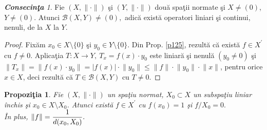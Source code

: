 \documentclass[ a4paper, 12pt]{report}
\newtheorem{prop}[theorem]{\bf Propozi\c tia }
\theoremstyle{definition}
\theoremstyle{remark}
\newtheorem{cons}{\bf Consecin\c ta }[section]
\numberwithin{equation}{section}
\begin{document}
\begin{cons}\label{c122}
Fie $(X, \lVert \cdot \rVert)$ \c si $(Y,\lVert \cdot  \rVert)$ dou\u a spa\c tii normate \c si $X \neq (0)$,\\
$Y \neq (0)$. Atunci $\mathcal{B}(X,Y) \neq (0),$ adic\u a exist\u a operatori liniari \c si continui, nenuli, de la $X$ la $Y$.
\end{cons}
\begin{proof}
Fix\u am $x_0 \in X\setminus \{ 0 \}$ \c si $y_0 \in Y \setminus \{ 0 \}$. Din Prop. \ref{p125}, rezult\u a c\u a exist\u a $f \in X^{'}$ cu $f \neq 0.$
Aplica\c tia $T : X \rightarrow Y,\  T_x = f(x) \cdot y_0$ este liniar\u a \c si nenul\u a $(y_0 \neq 0)$ \c si $\lVert T_x \rVert = \lVert f(x) \cdot y_0 \rVert = \lvert f(x) \rvert \cdot \lVert y_0 \rVert \leq \lVert f  \rVert \cdot \lVert y_0 \rVert \cdot \lVert x \rVert$, pentru orice $x \in X$, deci rezult\u a c\u a $T \in \mathcal{B}(X,Y) $ cu $T \neq 0.$
\end{proof}
\begin{prop}\label{p126}
Fie $(X,\lVert \cdot \rVert)$ un spa\c tiu normat, $X_0 \subset X$ un subspa\c tiu liniar \^inchis \c si $x_0 \in X \setminus X_0$.
Atunci exist\u a $f \in X^{'}$ cu $f(x_0) = 1$ \c si $f/X_0 = 0.$\\
\^In plus, $\lVert f \rVert = \displaystyle\frac{1}{d(x_0,X_0)}.$
\end{prop}
\end{document}
